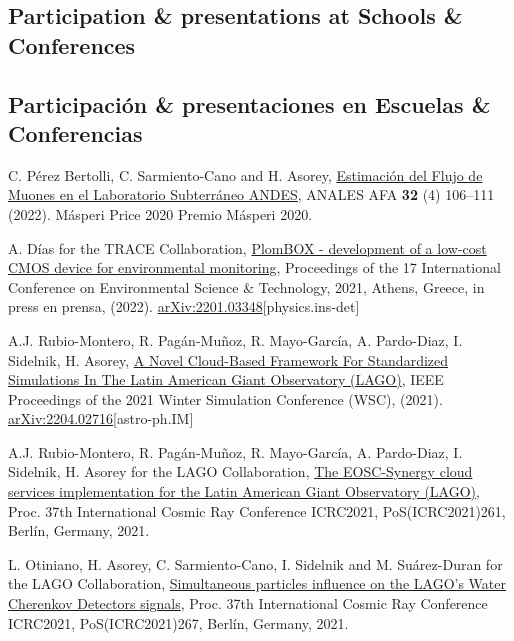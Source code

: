 \ifeng
\subsection*{Participation \& presentations at Schools \& Conferences}
\else
\subsection*{Participación \& presentaciones en Escuelas \& Conferencias}
\fi
\noindent
\begin{etaremune}

\item {} C. Pérez Bertolli, C. Sarmiento-Cano and H. Asorey, \href{https://afan.df.uba.ar/journal/index.php/analesafa/article/view/2300}{Estimación del Flujo de Muones en el Laboratorio Subterráneo ANDES}, ANALES AFA {\bf{32}} (4) 106--111 (2022). \ifeng Másperi Price 2020 \else Premio Másperi 2020\fi.

\item {} A. Días for the TRACE Collaboration, \href{}{PlomBOX - development of a low-cost CMOS device for environmental monitoring}, \en Proceedings of the 17 International Conference on Environmental Science \& Technology, 2021, Athens, Greece, \ifeng in press \else en prensa\fi, (2022). \href{http://arxiv.org/abs/2201.03348}{arXiv:2201.03348}[physics.ins-det]

\item {} A.J. Rubio-Montero, R. Pagán-Muñoz, R. Mayo-García, A. Pardo-Diaz, I. Sidelnik, H. Asorey, \href{https://doi.org/10.1109/WSC52266.2021.9715360}{A Novel Cloud-Based Framework For Standardized Simulations In The Latin American Giant Observatory (LAGO)}, \en IEEE Proceedings of the 2021 Winter Simulation Conference (WSC), (2021). \href{http://arxiv.org/abs/2204.02716}{arXiv:2204.02716}[astro-ph.IM]

\item {} A.J. Rubio-Montero, R. Pagán-Muñoz, R. Mayo-García, A. Pardo-Diaz, I. Sidelnik, H. Asorey for the LAGO Collaboration, \href{https://doi.org/10.22323/1.395.0261}{The EOSC-Synergy cloud services implementation for the Latin American Giant Observatory (LAGO)}, \en Proc. 37th International Cosmic Ray Conference ICRC2021, PoS(ICRC2021)261, Berlín, Germany, 2021.

\item {} L. Otiniano, H. Asorey, C. Sarmiento-Cano, I. Sidelnik and M. Suárez-Duran for the LAGO Collaboration, \href{https://doi.org/10.22323/1.395.0267}{Simultaneous particles influence on the LAGO’s Water Cherenkov Detectors signals}, \en Proc. 37th International Cosmic Ray Conference ICRC2021, PoS(ICRC2021)267, Berlín, Germany, 2021.


\end{etaremune}

